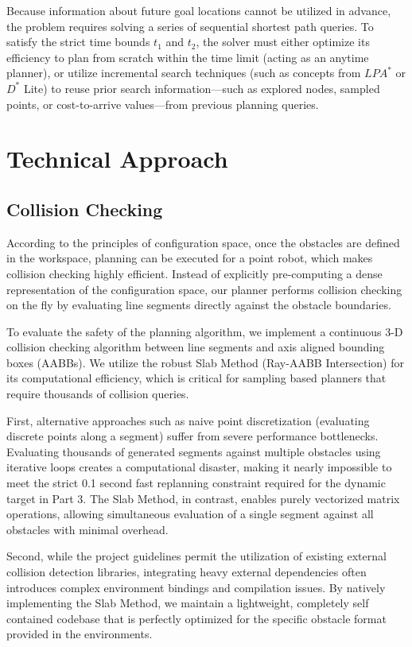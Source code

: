 \documentclass[letterpaper,journal]{IEEEtran}
\begin{document}
Because information about future goal locations cannot be utilized in advance, the problem requires solving a series of sequential shortest path queries. To satisfy the strict time bounds $t_1$ and $t_2$, the solver must either optimize its efficiency to plan from scratch within the time limit (acting as an anytime planner), or utilize incremental search techniques (such as concepts from $LPA^*$ or $D^*$ Lite) to reuse prior search information—such as explored nodes, sampled points, or cost-to-arrive values—from previous planning queries.


\section{Technical Approach}
\subsection{Collision Checking}
According to the principles of configuration space, once the obstacles are defined in the workspace, planning can be executed for a point robot, which makes collision checking highly efficient. Instead of explicitly pre-computing a dense representation of the configuration space, our planner performs collision checking on the fly by evaluating line segments directly against the obstacle boundaries.

To evaluate the safety of the planning algorithm, we implement a continuous 3-D collision checking algorithm between line segments and axis aligned bounding boxes (AABBs). We utilize the robust Slab Method (Ray-AABB Intersection) for its computational efficiency, which is critical for sampling based planners that require thousands of collision queries.

First, alternative approaches such as naive point discretization (evaluating discrete points along a segment) suffer from severe performance bottlenecks. Evaluating thousands of generated segments against multiple obstacles using iterative loops creates a computational disaster, making it nearly impossible to meet the strict 0.1 second fast replanning constraint required for the dynamic target in Part 3. The Slab Method, in contrast, enables purely vectorized matrix operations, allowing simultaneous evaluation of a single segment against all obstacles with minimal overhead.

Second, while the project guidelines permit the utilization of existing external collision detection libraries, integrating heavy external dependencies often introduces complex environment bindings and compilation issues. By natively implementing the Slab Method, we maintain a lightweight, completely self contained codebase that is perfectly optimized for the specific obstacle format provided in the environments.
\end{document}
